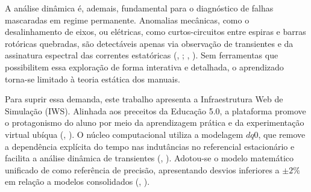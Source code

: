 \documentclass[a4paper]{ifacconf}
\begin{document}
\begin{table}[htbp]
\centering
\caption{Comparação funcional entre a IWS proposta e ferramentas convencionais de simulação.}
\label{tab:comparacao_ferramentas}
\end{table}

A análise dinâmica é, ademais, fundamental para o diagnóstico de falhas mascaradas em regime permanente. Anomalias mecânicas, como o desalinhamento de eixos, ou elétricas, como curtos-circuitos entre espiras e barras rotóricas quebradas, são detectáveis apenas via observação de transientes e da assinatura espectral das correntes estatóricas (\citeauthor{tuanmohamad2024advance}, \citeyear{tuanmohamad2024advance}; \citeauthor{arkan2005modelling}, \citeyear{arkan2005modelling}). Sem ferramentas que possibilitem essa exploração de forma interativa e detalhada, o aprendizado torna-se limitado à teoria estática dos manuais.

Para suprir essa demanda, este trabalho apresenta a Infraestrutura Web de Simulação (IWS). Alinhada aos preceitos da Educação 5.0, a plataforma promove o protagonismo do aluno por meio da aprendizagem prática e da experimentação virtual ubíqua (\citeauthor{cordeiro2024educacao}, \citeyear{cordeiro2024educacao}). O núcleo computacional utiliza a modelagem $dq0$, que remove a dependência explícita do tempo nas indutâncias no referencial estacionário e facilita a análise dinâmica de transientes (\citeauthor{sengamalai2022three}, \citeyear{sengamalai2022three}). Adotou-se o modelo matemático unificado de \cite{usta2024mathematical} como referência de precisão, apresentando desvios inferiores a $\pm 2\%$ em relação a modelos consolidados (\citeauthor{leroux2022static}, \citeyear{leroux2022static}).
\end{document}
